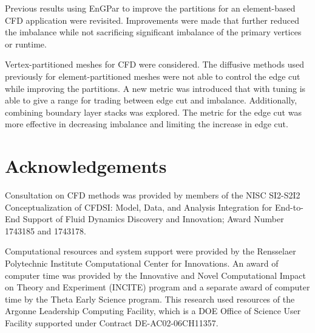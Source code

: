 \documentclass[conference]{IEEEtran}
\begin{document}
Previous results using EnGPar to improve the partitions for an element-based CFD application
were revisited. Improvements were made that further reduced the
imbalance while not sacrificing significant imbalance of the primary vertices or
runtime.

Vertex-partitioned meshes for CFD were considered. The diffusive methods used previously for
element-partitioned meshes were not able to control the edge cut while improving the partitions.
A new metric was introduced that with tuning is able to give a range for trading between edge
cut and imbalance. Additionally, combining boundary layer stacks was explored. The metric for
the edge cut was more effective in decreasing imbalance and limiting the increase in edge cut.



\section{Acknowledgements}

Consultation on CFD methods was provided by members of the NISC SI2-S2I2
Conceptualization of CFDSI: Model, Data, and Analysis Integration for End-to-End
Support of Fluid Dynamics Discovery and Innovation; Award Number 1743185 and 
1743178.

Computational resources and system support were provided by the Rensselaer
Polytechnic Institute Computational Center for Innovations.
An award of computer time was provided by the Innovative and Novel Computational
Impact on Theory and Experiment (INCITE) program and a separate award of
computer time by the Theta Early Science program.
This research used resources of the Argonne Leadership Computing Facility, which
is a DOE Office of Science User Facility supported under Contract
DE-AC02-06CH11357.





\end{document}
